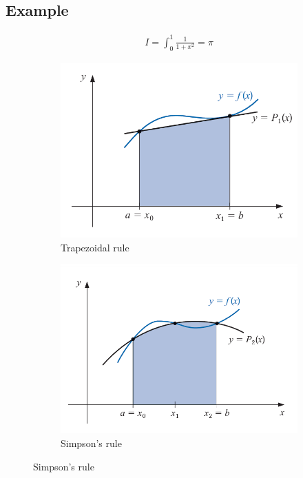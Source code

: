 \subsection{Example}
\begin{tauenv}[frametitle=Formula]
    \begin{align}
        I=\int_{0}^{1}\frac{1}{1+x^2}=\pi
    \end{align}
\end{tauenv}
\nolinenumbers

\linenumbers
\begin{figure}[tp]
    \centering
    \begin{subfigure}{0.45\linewidth}
    \includegraphics[width=\linewidth]{figures/T} 
    \caption{Trapezoidal rule\cite{PFGPlots}}
    \end{subfigure}
    \begin{subfigure}{0.45\linewidth}
        \includegraphics[width=\linewidth]{figures/S} 
        \caption{Simpson's rule}
    \end{subfigure}
\end{figure}
